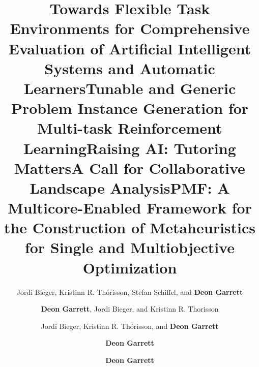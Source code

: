 \documentclass[a4paper,10pt]{cvclean}
\begin{document}
\begin{publications}
  \begin{conferencepapers}
    \begin{paper}
      \title{Towards Flexible Task Environments for Comprehensive Evaluation of Artificial Intelligent Systems and Automatic Learners}
      \author{Jordi Bieger, Kristinn R. Thórisson, Stefan Schiffel, and \textbf{Deon Garrett}}
    \end{paper}
    \begin{paper}
      \title{Tunable and Generic Problem Instance Generation for Multi-task
        Reinforcement Learning}
      \author{\textbf{Deon Garrett}, Jordi Bieger, and Kristinn R. Thorisson}
    \end{paper}
    \begin{paper}
      \title{Raising AI: Tutoring Matters}
      \author{Jordi Bieger, Kristinn R. Thórisson, and \textbf{Deon Garrett}}
    \end{paper}
    \begin{paper}
      \title{A Call for Collaborative Landscape Analysis}
      \author{\textbf{Deon Garrett}}
    \end{paper}
    \begin{paper}
      \title{PMF: A Multicore-Enabled Framework for the Construction of
        Metaheuristics for Single and Multiobjective Optimization}
      \author{\textbf{Deon Garrett}}
    \end{paper}
    \begin{paper}

\end{paper}
\end{conferencepapers}
\end{publications}
\end{document}
